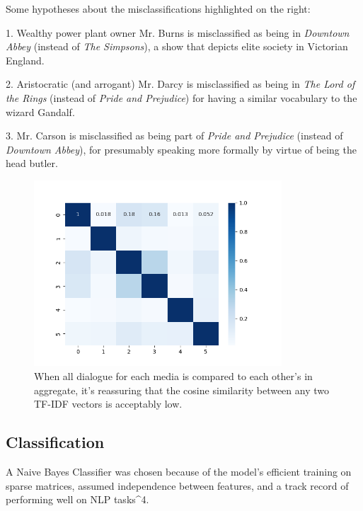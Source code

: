 \documentclass{article}
\newcommand{\largeimagewidth}{350}
\begin{document}
\begin{titlepage}
Some hypotheses about the misclassifications highlighted on the right:

1. Wealthy power plant owner Mr. Burns is misclassified as being in \textit{Downtown Abbey} (instead of \textit{The Simpsons}), a show that depicts elite society in Victorian England.

2. Aristocratic (and arrogant) Mr. Darcy is misclassified as being in \textit{The Lord of the Rings} (instead of \textit{Pride and Prejudice}) for having a similar vocabulary to the wizard Gandalf.

3. Mr. Carson is misclassified as being part of \textit{Pride and Prejudice} (instead of \textit{Downtown Abbey}), for presumably speaking more formally by virtue of being the head butler.

\begin{figure}[H]
\centering
\includegraphics[width=\largeimagewidth]{images/tfidf_across_document_heatmap.png}
\caption{When all dialogue for each media is compared to each other's in aggregate, it's reassuring that the cosine similarity between any two TF-IDF vectors is acceptably low.}
\end{figure}

\subsection{Classification}

A Naive Bayes Classifier was chosen because of the model's efficient training on sparse matrices, assumed independence between features, and a track record of performing well on NLP tasks^4.


\end{titlepage}
\end{document}
